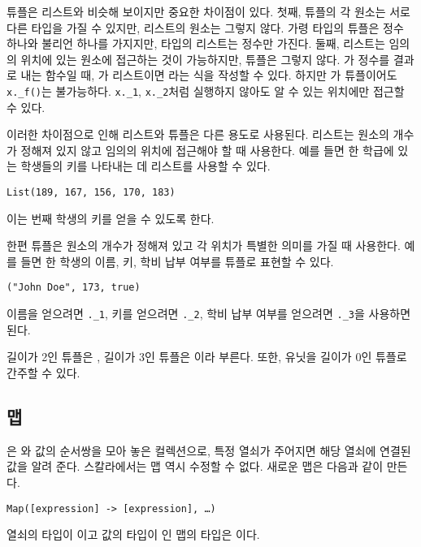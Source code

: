 튜플은 리스트와 비슷해 보이지만 중요한 차이점이 있다. 첫째, 튜플의 각 원소는
서로 다른 타입을 가질 수 있지만, 리스트의 원소는 그렇지 않다. 가령  타입의 튜플은 정수 하나와 불리언 하나를 가지지만,  타입의
리스트는 정수만 가진다. 둘째, 리스트는 임의의 위치에 있는 원소에 접근하는 것이
가능하지만, 튜플은 그렇지 않다. 가 정수를 결과로 내는 함수일 때,
가 리스트이면 라는 식을 작성할 수 있다.
하지만 가 튜플이어도 \verb!x._f()!는 불가능하다. \verb!x._1!,
\verb!x._2!처럼 실행하지 않아도 알 수 있는 위치에만 접근할 수 있다.

이러한 차이점으로 인해 리스트와 튜플은 다른 용도로 사용된다. 리스트는 원소의
개수가 정해져 있지 않고 임의의 위치에 접근해야 할 때 사용한다. 예를 들면 한
학급에 있는 학생들의 키를 나타내는 데 리스트를 사용할 수 있다.

\begin{verbatim}
List(189, 167, 156, 170, 183)
\end{verbatim}

이는 번째 학생의 키를 얻을 수 있도록 한다.

한편 튜플은 원소의 개수가 정해져 있고 각 위치가 특별한 의미를 가질 때 사용한다.
예를 들면 한 학생의 이름, 키, 학비 납부 여부를 튜플로 표현할 수 있다.

\begin{verbatim}
("John Doe", 173, true)
\end{verbatim}

이름을 얻으려면 \verb!._1!, 키를 얻으려면 \verb!._2!, 학비 납부 여부를 얻으려면
\verb!._3!을 사용하면
된다.

길이가 2인 튜플은 , 길이가 3인 튜플은 이라 부른다. 또한,
유닛을 길이가 0인 튜플로 간주할 수 있다.

\subsection{맵}

은 와 값의 순서쌍을 모아 놓은 컬렉션으로, 특정 열쇠가 주어지면 해당
열쇠에 연결된 값을 알려 준다. 스칼라에서는 맵 역시 수정할 수 없다. 새로운 맵은
다음과 같이 만든다.

\begin{verbatim}
Map([expression] -> [expression], …)
\end{verbatim}

열쇠의 타입이 이고 값의 타입이 인 맵의 타입은 이다.

